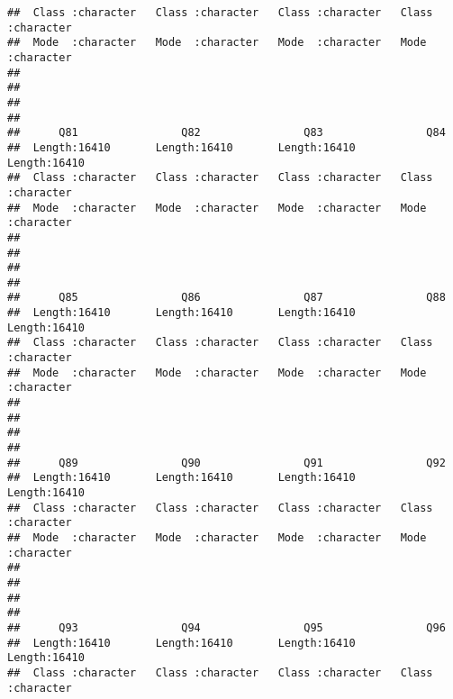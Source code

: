 \documentclass[
]{article}
\begin{document}
\begin{verbatim}
##  Class :character   Class :character   Class :character   Class :character  
##  Mode  :character   Mode  :character   Mode  :character   Mode  :character  
##                                                                             
##                                                                             
##                                                                             
##                                                                             
##      Q81                Q82                Q83                Q84           
##  Length:16410       Length:16410       Length:16410       Length:16410      
##  Class :character   Class :character   Class :character   Class :character  
##  Mode  :character   Mode  :character   Mode  :character   Mode  :character  
##                                                                             
##                                                                             
##                                                                             
##                                                                             
##      Q85                Q86                Q87                Q88           
##  Length:16410       Length:16410       Length:16410       Length:16410      
##  Class :character   Class :character   Class :character   Class :character  
##  Mode  :character   Mode  :character   Mode  :character   Mode  :character  
##                                                                             
##                                                                             
##                                                                             
##                                                                             
##      Q89                Q90                Q91                Q92           
##  Length:16410       Length:16410       Length:16410       Length:16410      
##  Class :character   Class :character   Class :character   Class :character  
##  Mode  :character   Mode  :character   Mode  :character   Mode  :character  
##                                                                             
##                                                                             
##                                                                             
##                                                                             
##      Q93                Q94                Q95                Q96           
##  Length:16410       Length:16410       Length:16410       Length:16410      
##  Class :character   Class :character   Class :character   Class :character  

\end{verbatim}
\end{document}
